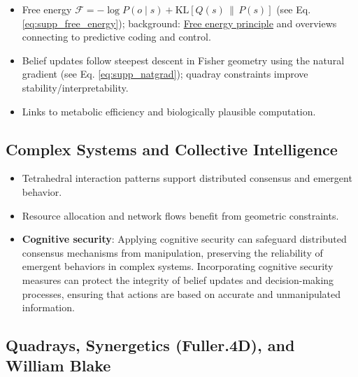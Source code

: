 \documentclass[
  10pt,
]{article}
\providecommand{\tightlist}{%
  \setlength{\itemsep}{0pt}\setlength{\parskip}{0pt}}
\begin{document}
\begin{itemize}
\tightlist
\item
  Free energy
  \(\mathcal{F} = -\log P(o\mid s) + \mathrm{KL}[Q(s)\,\|\,P(s)]\) (see
  Eq. \eqref{eq:supp_free_energy}); background:
  \href{https://en.wikipedia.org/wiki/Free_energy_principle}{Free energy
  principle} and overviews connecting to predictive coding and control.
\item
  Belief updates follow steepest descent in Fisher geometry using the
  natural gradient (see Eq. \eqref{eq:supp_natgrad}); quadray
  constraints improve stability/interpretability.
\item
  Links to metabolic efficiency and biologically plausible computation.
\end{itemize}

\hypertarget{complex-systems-and-collective-intelligence}{%
\subsection{Complex Systems and Collective
Intelligence}\label{complex-systems-and-collective-intelligence}}

\begin{itemize}
\tightlist
\item
  Tetrahedral interaction patterns support distributed consensus and
  emergent behavior.
\item
  Resource allocation and network flows benefit from geometric
  constraints.
\item
  \textbf{Cognitive security}: Applying cognitive security can safeguard
  distributed consensus mechanisms from manipulation, preserving the
  reliability of emergent behaviors in complex systems. Incorporating
  cognitive security measures can protect the integrity of belief
  updates and decision-making processes, ensuring that actions are based
  on accurate and unmanipulated information.
\end{itemize}

\hypertarget{quadrays-synergetics-fuller.4d-and-william-blake}{%
\subsection{Quadrays, Synergetics (Fuller.4D), and William
Blake}\label{quadrays-synergetics-fuller.4d-and-william-blake}}
\end{document}
